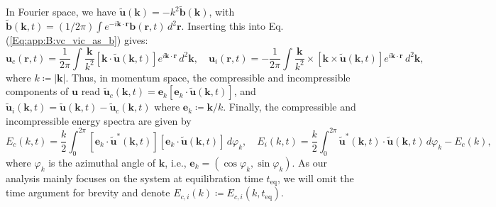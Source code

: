 \documentclass[aps,prl,twocolumn,showpacs,notitlepage,floatfix,superscriptaddress]{revtex4-1}
\begin{document}
In Fourier space, we have $\boldsymbol{\tilde{u}}(\boldsymbol{k})=-{k}^{2}\boldsymbol{\tilde{b}}(\boldsymbol{k})$, with $\boldsymbol{\tilde{b}} \left( \boldsymbol{k}, t \right)
=
\left( 1 / 2 \pi \right)
\int
e^{- i \boldsymbol{k} \cdot \boldsymbol{r}}
\boldsymbol{b} \left( \boldsymbol{r}, t \right)
\, d^2 \boldsymbol{r} $.
Inserting this into Eq. (\ref{Eq:app:B:vc_vic_as_b}) gives:
\begin{equation}\label{u_c_and_u_i_expressed_as_k_integrals}
\boldsymbol{u}_{c} \left( \boldsymbol{r}, t \right)
=
\frac{1}{2 \pi}
\int
\frac{\boldsymbol{k}}{k^2}
\left\lbrack
\boldsymbol{k}
\cdot
\boldsymbol{\tilde{u}} \left( \boldsymbol{k}, t \right)
\right\rbrack
e^{i \boldsymbol{k} \cdot \boldsymbol{r}}
\, d^2 \boldsymbol{k}
, \quad
\boldsymbol{u}_{i} \left( \boldsymbol{r}, t \right)
=
-
\frac{1}{2 \pi}
\int
\frac{\boldsymbol{k}}{k^2}
\times
\left\lbrack
\boldsymbol{k}
\times
\boldsymbol{\tilde{u}} \left( \boldsymbol{k}, t \right)
\right\rbrack
e^{i \boldsymbol{k} \cdot \boldsymbol{r}}
\, d^2 \boldsymbol{k}
,
\end{equation}
where $k \coloneqq \left\vert \boldsymbol{k} \right\vert$.
Thus, in momentum space, the compressible and incompressible components of $\boldsymbol{u}$ read
$
\boldsymbol{\tilde{u}}_{c} \left( \boldsymbol{k}, t \right)
=
\boldsymbol{e}_k
\left\lbrack
\boldsymbol{e}_k
\cdot
\boldsymbol{\tilde{u}} \left( \boldsymbol{k}, t \right)
\right\rbrack
$, and
$
\boldsymbol{\tilde{u}}_{i} \left( \boldsymbol{k}, t \right)
=
\boldsymbol{\tilde{u}} \left( \boldsymbol{k}, t \right)
-
\boldsymbol{\tilde{u}}_{c} \left( \boldsymbol{k}, t \right)
$ where $\boldsymbol{e}_k \coloneqq \boldsymbol{k} / k$.
Finally, the compressible and incompressible energy spectra are given by
\begin{equation}\label{E_c_k_and_E_i_k_equations}
E_{c} \left( k
, t
\right)
=
\frac{k}{2}
\int_{0}^{2 \pi}
\left\lbrack
\boldsymbol{e}_k
\cdot
\boldsymbol{\tilde{u}}^{*} \left( \boldsymbol{k}, t \right)
\right\rbrack
\left\lbrack
\boldsymbol{e}_k
\cdot
\boldsymbol{\tilde{u}} \left( \boldsymbol{k}, t \right)
\right\rbrack
\, d \varphi_k
, \quad
E_{i} \left( k
, t
\right)
=
\frac{k}{2}
\int_{0}^{2 \pi}
\boldsymbol{\tilde{u}}^{*} \left( \boldsymbol{k}, t \right)
\cdot
\boldsymbol{\tilde{u}} \left( \boldsymbol{k}, t \right)
\, d \varphi_k
-
E_{c} \left( k \right)
,
\end{equation}
where $\varphi_k$ is the azimuthal angle of $\boldsymbol{k}$, i.e., $\boldsymbol{e}_k = \left( \cos \varphi_k, \sin \varphi_k \right)$.
As our analysis mainly focuses on the system at equilibration time $t_{\textrm{eq}}$, we will omit the time argument for brevity and denote $E_{c, i}(k) \coloneqq E_{c, i}(k, t_{\textrm{eq}})$.
\end{document}

